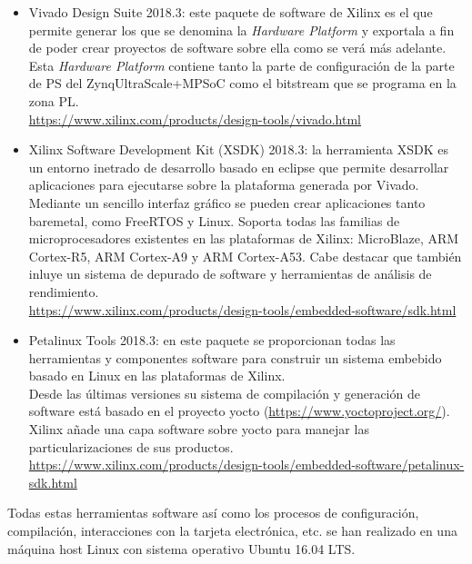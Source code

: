 \begin{itemize}
  \item Vivado Design Suite 2018.3: este paquete de software de Xilinx es el que permite generar los que se denomina la \textit{Hardware Platform} y exportala a fin de poder crear proyectos de software sobre ella como se verá más adelante. Esta \textit{Hardware Platform} contiene tanto la parte de configuración de la parte de PS del Zynq\textregistered UltraScale+\texttrademark MPSoC como el bitstream que se programa en la zona PL.\\
  \url{https://www.xilinx.com/products/design-tools/vivado.html}
  \item Xilinx Software Development Kit (XSDK) 2018.3: la herramienta \acrshort{XSDK} es un entorno inetrado de desarrollo basado en eclipse que permite desarrollar aplicaciones para ejecutarse sobre la plataforma generada por Vivado. Mediante un sencillo interfaz gráfico se pueden crear aplicaciones tanto baremetal, como FreeRTOS y Linux. Soporta todas las familias de microprocesadores existentes en las plataformas de Xilinx: MicroBlaze, ARM Cortex-R5, ARM Cortex-A9 y ARM Cortex-A53. Cabe destacar que también inluye un sistema de depurado de software y herramientas de análisis de rendimiento.\\
  \url{https://www.xilinx.com/products/design-tools/embedded-software/sdk.html}
  \item Petalinux Tools 2018.3: en este paquete se proporcionan todas las herramientas y componentes software para construir un sistema embebido basado en Linux en las plataformas de Xilinx.\\
  Desde las últimas versiones su sistema de compilación y generación de software está basado en el proyecto yocto (\url{https://www.yoctoproject.org/}). Xilinx añade una capa software sobre yocto para manejar las particularizaciones de sus productos.\\
  \url{https://www.xilinx.com/products/design-tools/embedded-software/petalinux-sdk.html}
\end{itemize}

Todas estas herramientas software así como los procesos de configuración, compilación, interacciones con la tarjeta electrónica, etc. se han realizado en una máquina host Linux con sistema operativo Ubuntu 16.04 LTS.
